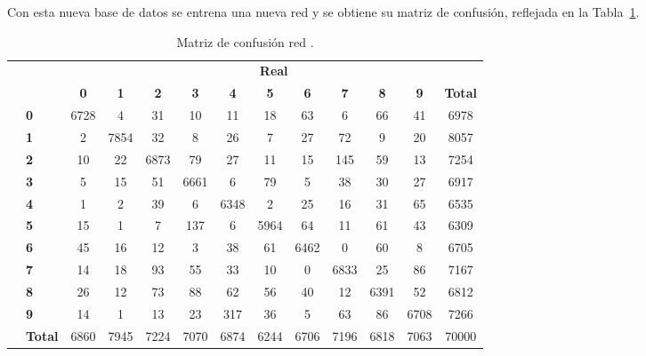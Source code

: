 \begin{description}
	Con esta nueva base de datos se entrena una nueva red y se obtiene su matriz de confusión, reflejada en la Tabla~\ref{tab.matriz0-1}.
	\begin{table}[H]
		\centering
		\begin{tabular}{|c|l|c|c|c|c|c|c|c|c|c|c|c|}
			\cline{3-13} 
			\multicolumn{2}{c|}{} & \multicolumn{11}{c|}{\textbf{Real}} \\ \cline{3-13} 
			\multicolumn{2}{c|}{} & \textbf{0} & \textbf{1} & \textbf{2} &  \textbf{3} & \textbf{4} & \textbf{5} & \textbf{6} & \textbf{7} & \textbf{8} & \textbf{9} & \textbf{Total}\\ \hline
			\multirow{10}{0.5cm}{\rotatebox{90}{\textbf{Predicción}}}& \textbf{0} & \cellcolor{lightgray}6728 & 4 & 31 & 10 & 11 & 18 & 63 & 6 & 66 & 41 & 6978\\ \cline{2-13}
			& \textbf{1} & 2 & \cellcolor{lightgray}7854 & 32 & 8 & 26 & 7 & 27 & 72 & 9 & 20 & 8057\\ \cline{2-13}
			& \textbf{2} & 10 & 22 & \cellcolor{lightgray}6873 & 79 & 27 & 11 & 15 & 145 & 59 & 13 & 7254\\ \cline{2-13}
			& \textbf{3} & 5 & 15 & 51 & \cellcolor{lightgray}6661 & 6 & 79 & 5 & 38 & 30 & 27 & 6917\\ \cline{2-13}
			& \textbf{4} & 1 & 2 & 39 & 6 & \cellcolor{lightgray}6348 & 2 & 25 & 16 & 31 & 65 & 6535\\ \cline{2-13}
			& \textbf{5} & 15 & 1 & 7 & 137 & 6 & \cellcolor{lightgray}5964 & 64 & 11 & 61 & 43 & 6309\\ \cline{2-13}
			& \textbf{6} & 45 & 16 & 12 & 3 & 38 & 61 & \cellcolor{lightgray}6462 & 0 & 60 & 8 & 6705\\ \cline{2-13}
			& \textbf{7} & 14 & 18 & 93 & 55 & 33 & 10 & 0 & \cellcolor{lightgray}6833 & 25 & 86 & 7167\\ \cline{2-13}
			& \textbf{8} & 26 & 12 & 73 & 88 & 62 & 56 & 40 & 12 & \cellcolor{lightgray}6391 & 52 & 6812\\ \cline{2-13}
			& \textbf{9} & 14 & 1 & 13 & 23 & 317 & 36 & 5 & 63 & 86 & \cellcolor{lightgray}6708 & 7266\\ \cline{2-13}
			& \textbf{Total} & 6860 & 7945 & 7224 & 7070 & 6874 & 6244 & 6706 & 7196 & 6818 & 7063 & 70000\\ \hline
		\end{tabular}
		\caption{Matriz de confusión red .}
		\label{tab.matriz0-1}
	\end{table}
\end{description}


